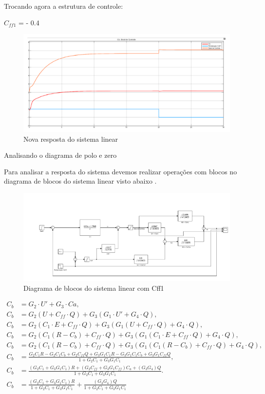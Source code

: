 \documentclass[a4paper,12pt]{article}
\begin{document}
Trocando agora a estrutura de controle:

\(C_{ff1}\) = - 0.4

\begin{figure} [H]
    \centering
    \includegraphics[width=0.8\linewidth]{image14.png}
    \caption{Nova resposta do sistema linear}    
\end{figure}

Analisando o diagrama de polo e zero

Para analisar a resposta do sistema devemos realizar operações com blocos no diagrama de blocos do sistema linear visto abaixo . 

\begin{figure} [H]
    \centering
    \includegraphics[width=0.8\linewidth]{image15.png}
    \caption{Diagrama de blocos do sistema linear com Cff1}
    
\end{figure}

\begin{align}
C_b &= G_2 \cdot U' + G_3 \cdot Ca, \\
C_b &= G_2 (U + C_{ff} \cdot Q) + G_3 (G_1 \cdot U' + G_4 \cdot Q), \\
C_b &= G_2 (C_1 \cdot E + C_{ff} \cdot Q) + G_3 (G_1 (U + C_{ff} \cdot Q) + G_4 \cdot Q), \\
C_b &= G_2 (C_1 (R - C_b) + C_{ff} \cdot Q) + G_3 (G_1 (C_1 \cdot E + C_{ff} \cdot Q) + G_4 \cdot Q), \\
C_b &= G_2 (C_1 (R - C_b) + C_{ff} \cdot Q) + G_3 (G_1 (C_1 (R - C_b) + C_{ff} \cdot Q) + G_4 \cdot Q), \\
C_b &= \frac{G_2C_1R - G_2C_1C_b + G_2C_{ff}Q + G_3G_1C_1R - G_3G_1C_1C_b + G_3G_1C_{ff}Q}{1 + G_2C_1 + G_3G_1C_1}, \\
C_b &= \frac{(G_2C_1 + G_3G_1C_1)R + (G_2C_{ff} + G_3G_1C_{ff})C_a + (G_3G_4)Q}{1 + G_2C_1 + G_3G_1C_1}.\\
C_b &= \frac{(G_2C_1 + G_3G_1C_1)R}{1 + G_2C_1 + G_3G_1C_1}+\frac{(G_3G_4)Q}{1 + G_2C_1 + G_3G_1C_1}
\end{align}
\end{document}
